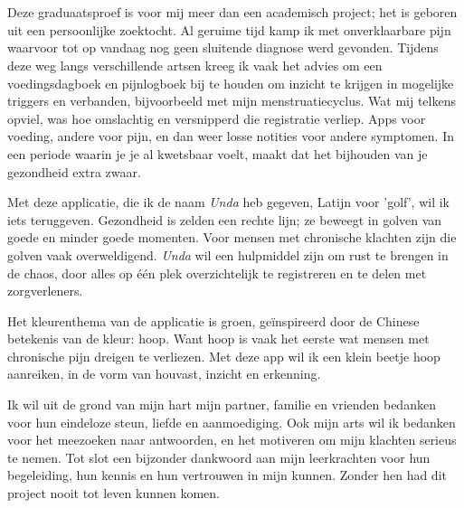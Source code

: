
\chapter*{}%
\label{ch:voorwoord}

Deze graduaatsproef is voor mij meer dan een academisch project; het is geboren uit een persoonlijke zoektocht. Al geruime tijd kamp ik met onverklaarbare pijn waarvoor tot op vandaag nog geen sluitende diagnose werd gevonden. Tijdens deze weg langs verschillende artsen kreeg ik vaak het advies om een voedingsdagboek en pijnlogboek bij te houden om inzicht te krijgen in mogelijke triggers en verbanden, bijvoorbeeld met mijn menstruatiecyclus. Wat mij telkens opviel, was hoe omslachtig en versnipperd die registratie verliep. Apps voor voeding, andere voor pijn, en dan weer losse notities voor andere symptomen. In een periode waarin je je al kwetsbaar voelt, maakt dat het bijhouden van je gezondheid extra zwaar.

Met deze applicatie, die ik de naam \textit{Unda} heb gegeven, Latijn voor 'golf', wil ik iets teruggeven. Gezondheid is zelden een rechte lijn; ze beweegt in golven van goede en minder goede momenten. Voor mensen met chronische klachten zijn die golven vaak overweldigend. \textit{Unda} wil een hulpmiddel zijn om rust te brengen in de chaos, door alles op één plek overzichtelijk te registreren en te delen met zorgverleners.

Het kleurenthema van de applicatie is groen, geïnspireerd door de Chinese betekenis van de kleur: hoop. Want hoop is vaak het eerste wat mensen met chronische pijn dreigen te verliezen. Met deze app wil ik een klein beetje hoop aanreiken, in de vorm van houvast, inzicht en erkenning.

Ik wil uit de grond van mijn hart mijn partner, familie en vrienden bedanken voor hun eindeloze steun, liefde en aanmoediging. Ook mijn arts wil ik bedanken voor het meezoeken naar antwoorden, en het motiveren om mijn klachten serieus te nemen. Tot slot een bijzonder dankwoord aan mijn leerkrachten voor hun begeleiding, hun kennis en hun vertrouwen in mijn kunnen. Zonder hen had dit project nooit tot leven kunnen komen.

